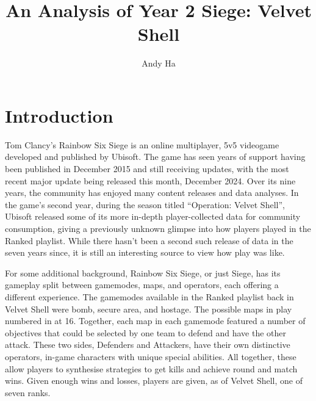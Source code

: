 \documentclass[12pt]{article}
\title{An Analysis of Year 2 Siege: Velvet Shell}
\author{Andy Ha}
\date{}
\begin{document}
\maketitle


\tableofcontents
\newpage


\section{Introduction}
Tom Clancy's Rainbow Six Siege is an online multiplayer, 5v5 videogame developed and published by Ubisoft.
The game has seen years of support having been published in December 2015 and still receiving updates, with the most recent major update being released this month, December 2024.
Over its nine years, the community has enjoyed many content releases and data analyses.
In the game's second year, during the season titled ``Operation: Velvet Shell'', Ubisoft released some of its more in-depth player-collected data for community consumption, giving a previously unknown glimpse into how players played in the Ranked playlist.
While there hasn't been a second such release of data in the seven years since, it is still an interesting source to view how play was like.

For some additional background, Rainbow Six Siege, or just Siege, has its gameplay split between gamemodes, maps, and operators, each offering a different experience.
The gamemodes available in the Ranked playlist back in Velvet Shell were bomb, secure area, and hostage.
The possible maps in play numbered in at 16.
Together, each map in each gamemode featured a number of objectives that could be selected by one team to defend and have the other attack.
These two sides, Defenders and Attackers, have their own distinctive operators, in-game characters with unique special abilities.
All together, these allow players to synthesise strategies to get kills and achieve round and match wins.
Given enough wins and losses, players are given, as of Velvet Shell, one of seven ranks.
\end{document}
